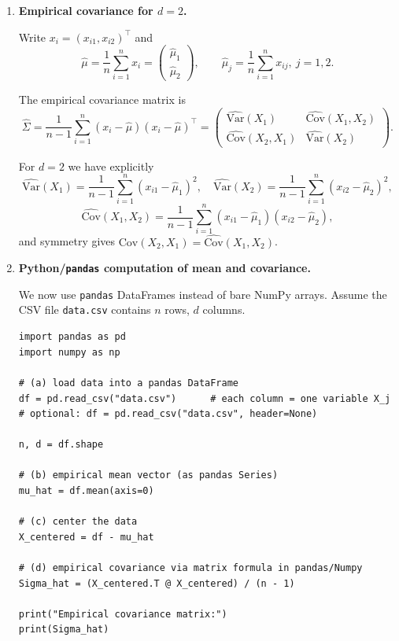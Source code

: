 \documentclass[11pt]{article}
\begin{document}
\begin{enumerate}

\item \textbf{Empirical covariance for $d=2$.}

Write $x_i=(x_{i1},x_{i2})^\top$ and
\[
\hat\mu=\frac1n\sum_{i=1}^n x_i
=
\begin{pmatrix}
\hat\mu_1\\
\hat\mu_2
\end{pmatrix},
\qquad
\hat\mu_j=\frac1n\sum_{i=1}^n x_{ij},\ j=1,2.
\]

The empirical covariance matrix is
\[
\widehat{\Sigma}
=\frac{1}{n-1}\sum_{i=1}^n
(x_i-\hat\mu)(x_i-\hat\mu)^\top
=
\begin{pmatrix}
\widehat{\mathrm{Var}}(X_1) & \widehat{\mathrm{Cov}}(X_1,X_2) \\
\widehat{\mathrm{Cov}}(X_2,X_1) & \widehat{\mathrm{Var}}(X_2)
\end{pmatrix}.
\]

For $d=2$ we have explicitly
\[
\widehat{\mathrm{Var}}(X_1)=\frac{1}{n-1}\sum_{i=1}^n (x_{i1}-\hat\mu_1)^2,
\quad
\widehat{\mathrm{Var}}(X_2)=\frac{1}{n-1}\sum_{i=1}^n (x_{i2}-\hat\mu_2)^2,
\]
\[
\widehat{\mathrm{Cov}}(X_1,X_2)
=\frac{1}{n-1}\sum_{i=1}^n (x_{i1}-\hat\mu_1)(x_{i2}-\hat\mu_2),
\]
and symmetry gives
\(\widehat{\mathrm{Cov}}(X_2,X_1)=\widehat{\mathrm{Cov}}(X_1,X_2)\).

\bigskip

\item \textbf{Python/\texttt{pandas} computation of mean and covariance.}

We now use \texttt{pandas} DataFrames instead of bare NumPy arrays.
Assume the CSV file \texttt{data.csv} contains $n$ rows, $d$ columns.

\begin{verbatim}
import pandas as pd
import numpy as np

# (a) load data into a pandas DataFrame
df = pd.read_csv("data.csv")      # each column = one variable X_j
# optional: df = pd.read_csv("data.csv", header=None)

n, d = df.shape

# (b) empirical mean vector (as pandas Series)
mu_hat = df.mean(axis=0)

# (c) center the data
X_centered = df - mu_hat

# (d) empirical covariance via matrix formula in pandas/Numpy
Sigma_hat = (X_centered.T @ X_centered) / (n - 1)

print("Empirical covariance matrix:")
print(Sigma_hat)


\end{verbatim}
\end{enumerate}
\end{document}
